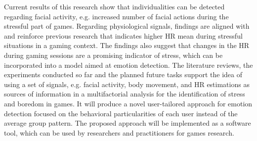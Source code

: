 Current results of this research show that individualities can be detected regarding facial activity, e.g. increased number of facial actions during the stressful part of games. Regarding physiological signals, findings are aligned with and reinforce previous research that indicates higher HR mean during stressful situations in a gaming context. The findings also suggest that changes in the HR during gaming sessions are a promising indicator of stress, which can be incorporated into a model aimed at emotion detection. The literature reviews, the experiments conducted so far and the planned future tasks support the idea of using a set of signals, e.g. facial activity, body movement, and HR estimations as sources of information in a multifactorial analysis for the identification of stress and boredom in games. It will produce a novel user-tailored approach for emotion detection focused on the behavioral particularities of each user instead of the average group pattern. The proposed approach will be implemented as a software tool, which can be used by researchers and practitioners for games research.
